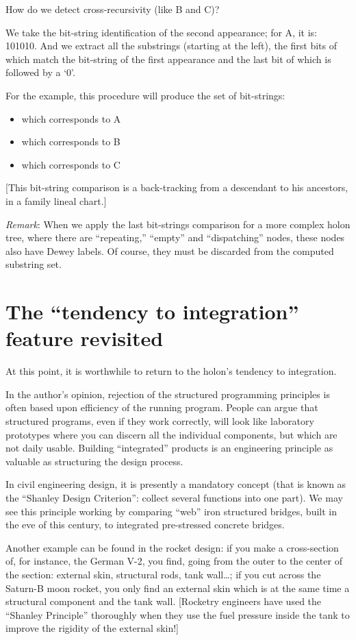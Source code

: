 \documentclass[openany,nobib]{tufte-book}
\begin{document}
How do we detect cross-recursivity (like B and C)?

We take the bit-string identification of the second appearance; for A, it is:
101010. And we extract all the substrings (starting at the left), the first
bits of which match the bit-string of the first appearance and the last bit of
which is followed by a `0'.

For the example, this procedure will produce the set of bit-strings:
\begin{itemize}
\setlength{\itemindent}{1cm}
\setlength\itemsep{-0.2em}
    \item[1]    which corresponds to A
    \item[101] which corresponds to B
    \item[10101] which corresponds to C
\end{itemize}
[This bit-string comparison is a back-tracking from a descendant to his
ancestors, in a family lineal chart.]

{\sl Remark}: When we apply the last bit-strings comparison for a more complex
holon tree, where there are ``repeating,'' ``empty'' and ``dispatching'' nodes,
these nodes also have Dewey labels. Of course, they must be discarded from the
computed substring set.

\section{The ``tendency to integration'' feature revisited}

At this point, it is worthwhile to return to the holon's tendency to
integration.

In the author's opinion, rejection of the structured programming principles is
often based upon efficiency of the running program. People can argue that
structured programs, even if they work correctly, will look like laboratory
prototypes where you can discern all the individual components, but which are
not daily usable. Building ``integrated'' products is an engineering principle
as valuable as structuring the design process.

In civil engineering design, it is presently a mandatory concept (that is known
as the ``Shanley Design Criterion'': collect several functions into one part).
We may see this principle working by comparing ``web'' iron structured bridges,
built in the eve of this century, to integrated pre-stressed concrete bridges.

Another example can be found in the rocket design: if you make a cross-section
of, for instance, the German V-2, you find, going from the outer to the center
of the section: external skin, structural rods, tank wall\dots; if you cut
across the Saturn-B moon rocket, you only find an external skin which is at the
same time a structural component and the tank wall. [Rocketry engineers have
used the ``Shanley Principle'' thoroughly when they use the fuel pressure
inside the tank to improve the rigidity of the external skin!]
\end{document}
